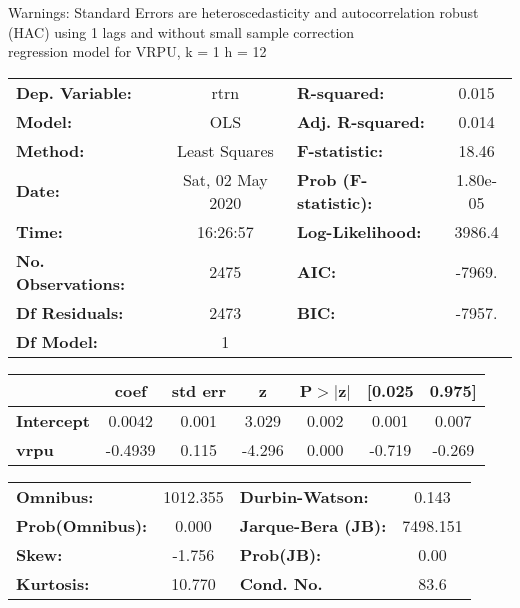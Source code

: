 Warnings: \newline
 [1] Standard Errors are heteroscedasticity and autocorrelation robust (HAC) using 1 lags and without small sample correction\\ 

regression model for VRPU, k = 1 h = 12\begin{center}
\begin{tabular}{lclc}
\toprule
\textbf{Dep. Variable:}    &       rtrn       & \textbf{  R-squared:         } &     0.015   \\
\textbf{Model:}            &       OLS        & \textbf{  Adj. R-squared:    } &     0.014   \\
\textbf{Method:}           &  Least Squares   & \textbf{  F-statistic:       } &     18.46   \\
\textbf{Date:}             & Sat, 02 May 2020 & \textbf{  Prob (F-statistic):} &  1.80e-05   \\
\textbf{Time:}             &     16:26:57     & \textbf{  Log-Likelihood:    } &    3986.4   \\
\textbf{No. Observations:} &        2475      & \textbf{  AIC:               } &    -7969.   \\
\textbf{Df Residuals:}     &        2473      & \textbf{  BIC:               } &    -7957.   \\
\textbf{Df Model:}         &           1      & \textbf{                     } &             \\
\bottomrule
\end{tabular}
\begin{tabular}{lcccccc}
                   & \textbf{coef} & \textbf{std err} & \textbf{z} & \textbf{P$> |$z$|$} & \textbf{[0.025} & \textbf{0.975]}  \\
\midrule
\textbf{Intercept} &       0.0042  &        0.001     &     3.029  &         0.002        &        0.001    &        0.007     \\
\textbf{vrpu}      &      -0.4939  &        0.115     &    -4.296  &         0.000        &       -0.719    &       -0.269     \\
\bottomrule
\end{tabular}
\begin{tabular}{lclc}
\textbf{Omnibus:}       & 1012.355 & \textbf{  Durbin-Watson:     } &    0.143  \\
\textbf{Prob(Omnibus):} &   0.000  & \textbf{  Jarque-Bera (JB):  } & 7498.151  \\
\textbf{Skew:}          &  -1.756  & \textbf{  Prob(JB):          } &     0.00  \\
\textbf{Kurtosis:}      &  10.770  & \textbf{  Cond. No.          } &     83.6  \\
\bottomrule
\end{tabular}
\end{center}

